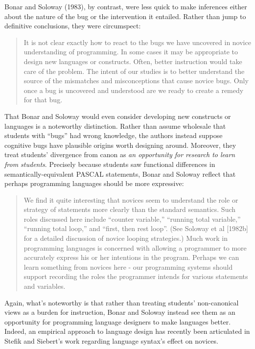Bonar and Soloway (1983), by contrast, were less quick to make
inferences either about the nature of the bug or the intervention
it entailed. Rather than jump to definitive conclusions, they were
circumspect:

\begin{quote}
  It is not clear exactly how to react to the bugs we have uncovered in
  novice understanding of programming. In some cases it may be appropriate
  to design new languages or constructs. Often, better instruction would
  take care of the problem. The intent of our studies is to better
  understand the source of the mismatches and misconceptions that cause
  novice bugs. Only once a bug is uncovered and understood are we ready to
  create a remedy for that bug. \cite{bonar_uncovering_1983}
\end{quote}

That Bonar and Soloway would even consider developing new constructs or
languages is a noteworthy distinction. Rather than assume wholesale that
students with ``bugs'' had wrong knowledge, the authors instead suppose
cognitive bugs have plausible origins worth designing around. Moreover,
they treat students' divergence from canon as \emph{an opportunity for
research to learn from students}. Precisely because students saw
functional differences in semantically-equivalent
PASCAL statements, Bonar and Soloway \cite{bonar_uncovering_1983} reflect that perhaps
programming languages should be more expressive:

\begin{quote}
  We find it quite interesting that novices seem to understand the role or
  strategy of statements more clearly than the standard semantics. Such
  roles discussed here include ``counter variable,'' ``running total
  variable,'' ``running total loop,'' and ``first, then rest loop''. (See
  Soloway et al {[}1982b{]} for a detailed discussion of novice looping
  strategies.) Much work in programming languages is concerned with
  allowing a programmer to more accurately express his or her intentions
  in the program. Perhaps we can learn something from novices here - our
  programming systems should support recording the roles the programmer
  intends for various statements and variables. \cite{bonar_uncovering_1983}
\end{quote}

Again, what's noteworthy is that rather than treating students'
non-canonical views as a burden for instruction, Bonar and Soloway
instead see them as an opportunity for programming language designers to
make languages better. Indeed, an empirical approach to language design has recently been articulated in Stefik and Siebert's work regarding language syntax's effect on novices. \cite{stefik_intuitive_2011}

